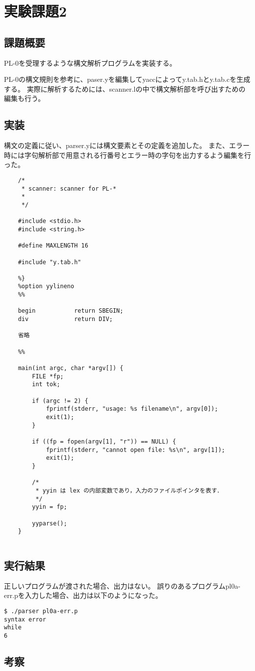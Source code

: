 \section{実験課題2}
\subsection{課題概要}
PL-0を受理するような構文解析プログラムを実装する。

PL-0の構文規則を参考に、paser.yを編集してyaccによってy.tab.hとy.tab.cを生成する。
実際に解析するためには、scanner.lの中で構文解析部を呼び出すための編集も行う。

\subsection{実装}
構文の定義に従い、parser.yには構文要素とその定義を追加した。
また、エラー時には字句解析部で用意される行番号とエラー時の字句を出力するよう編集を行った。



\begin{lstlisting}[caption={scanner.l},label={scanner.l2}]
  %{
    /* 
     * scanner: scanner for PL-*
     * 
     */
    
    #include <stdio.h>
    #include <string.h>
    
    #define MAXLENGTH 16
    
    #include "y.tab.h"
    
    %}
    %option yylineno
    %%
    
    begin           return SBEGIN;
    div             return DIV;
    
    省略

    %%
    
    main(int argc, char *argv[]) {
        FILE *fp;
        int tok;
        
        if (argc != 2) {
            fprintf(stderr, "usage: %s filename\n", argv[0]);
            exit(1);
        }
    
        if ((fp = fopen(argv[1], "r")) == NULL) {
            fprintf(stderr, "cannot open file: %s\n", argv[1]);
            exit(1);
        }
    
        /*
         * yyin は lex の内部変数であり，入力のファイルポインタを表す．
         */
        yyin = fp;
    
        yyparse();
    }
    
\end{lstlisting}

\subsection{実行結果}
正しいプログラムが渡された場合、出力はない。
誤りのあるプログラムpl0a-err.pを入力した場合、出力は以下のようになった。
\begin{lstlisting}[caption={pl0a-err.pの出力},label={pl0a-err.pの出力}]
$ ./parser pl0a-err.p
syntax error
while
6
\end{lstlisting}

\subsection{考察}
